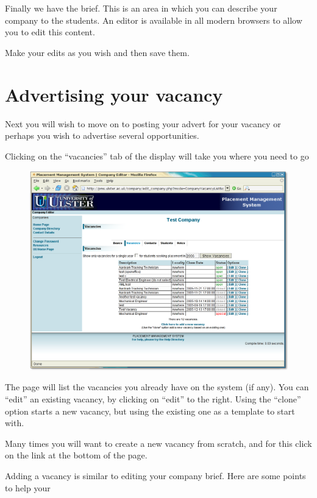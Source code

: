 Finally we have the brief. This is an area in which you can
describe your company to the students. An editor is available in
all modern browsers to allow you to edit this content.

Make your edits as you wish and then save them.

\section{Advertising your vacancy}

Next you will wish to move on to posting your advert for your
vacancy or perhaps you wish to advertise several opportunities.

Clicking on the ``vacancies'' tab of the display will take you
where you need to go
\begin{figure}[htb]
\begin{center}
\includegraphics[scale=0.25]{png/company_hr4.png}
\end{center}
\end{figure}


The page will list the vacancies you already have on the system
(if any). You can ``edit'' an existing vacancy, by clicking on
``edit'' to the right. Using the ``clone'' option starts a new
vacancy, but using the existing one as a template to start with.

Many times you will want to create a new vacancy from scratch,
and for this click on the link at the bottom of the page.

Adding a vacancy is similar to editing your company brief.
Here are some points to help your

